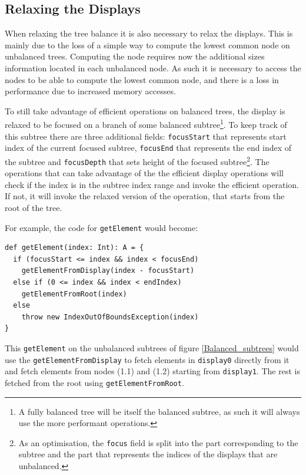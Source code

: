 
\subsection{Relaxing the Displays}
When relaxing the tree balance it is also necessary to relax the displays. This is mainly due to the loss of a simple way to compute the lowest common node on unbalanced trees. Computing the node requires now the additional sizes information located in each unbalanced node. As such it is necessary to access the nodes to be able to compute the lowest common node, and there is a loss in performance due to increased memory accesses.  

To still take advantage of efficient operations on balanced trees, the display is relaxed to be focused on a branch of some balanced subtree\footnote{A fully balanced tree will be itself the balanced subtree, as such it will always use the more performant operations.}. To keep track of this subtree there are three additional fields: \texttt{focusStart} that represents start index of the current focused subtree, \texttt{focusEnd} that represents the end index of the subtree and \texttt{focusDepth} that sets  height of the focused subtree\footnote{As an optimisation, the \texttt{focus} field is split into the part corresponding to the subtree and the part that represents the indices of the displays that are unbalanced.}. The operations that can take advantage of the the efficient display operations will check if the index is in the subtree index range and invoke the efficient operation. If not, it will invoke the relaxed version of the operation, that starts from the root of the tree.

For example, the code for \texttt{getElement} would become:
\begin{lstlisting}[frame=single]
def getElement(index: Int): A = {
  if (focusStart <= index && index < focusEnd) 
    getElementFromDisplay(index - focusStart)
  else if (0 <= index && index < endIndex) 
    getElementFromRoot(index)    
  else 
    throw new IndexOutOfBoundsException(index)
}
\end{lstlisting}

This \texttt{getElement} on the unbalanced subtrees of figure \ref{Balanced_subtrees}  would use the \texttt{getElementFromDisplay} to fetch elements in \texttt{display0} directly from it and fetch elements from nodes (1.1) and (1.2) starting from \texttt{display1}. The rest is fetched from the root using \texttt{getElementFromRoot}.

